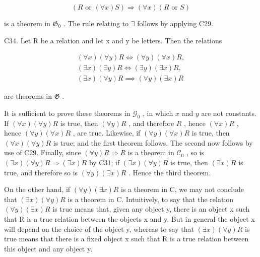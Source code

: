 \[
(R \text {   or   } (\forall x) S) \Longrightarrow (\forall x) (R \text {   or   } S)
\]

is a theorem in \(\mathfrak{G}_0\) . The rule relating to \(\exists\) follows by applying C29.

C34. Let R be a relation and let x and y be letters. Then the relations

\[
\begin{array}{l} (\forall x) (\forall y) R \iff (\forall y) (\forall x) R, \\ (\exists x) (\exists y) R \iff (\exists y) (\exists x) R, \\ (\exists x) (\forall y) R \implies (\forall y) (\exists x) R \end{array}
\]

are theorems in \(\mathfrak{G}\) .

It is sufficient to prove these theorems in \(\mathcal{G}_0\) , in which \(x\) and \(y\) are not constants. If \((\forall x)(\forall y)R\) is true, then \((\forall y)R\) , and therefore \(R\) , hence \((\forall x)R\) , hence \((\forall y)(\forall x)R\) , are true. Likewise, if \((\forall y)(\forall x)R\) is true, then \((\forall x)(\forall y)R\) is true; and the first theorem follows. The second now follows by use of C29. Finally, since \((\forall y)R \Longrightarrow R\) is a theorem in \(\mathcal{C}_0\) , so is \((\exists x)(\forall y)R \Longrightarrow (\exists x)R\) by C31; if \((\exists x)(\forall y)R\) is true, then \((\exists x)R\) is true, and therefore so is \((\forall y)(\exists x)R\) . Hence the third theorem.

On the other hand, if \((\forall y)(\exists x)R\) is a theorem in C, we may not conclude that \((\exists x)(\forall y)R\) is a theorem in C. Intuitively, to say that the relation \((\forall y)(\exists x)R\) is true means that, given any object y, there is an object x such that R is a true relation between the objects x and y. But in general the object x will depend on the choice of the object y, whereas to say that \((\exists x)(\forall y)R\) is true means that there is a fixed object x such that R is a true relation between this object and any object y.


